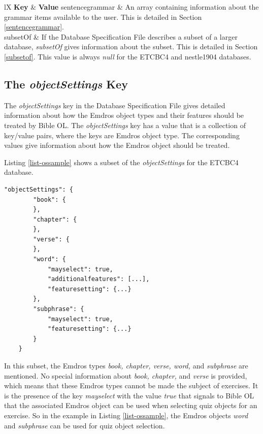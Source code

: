 \documentclass[11pt,oneside,a4paper]{memoir}
\makeatletter
\newenvironment{my-longtabu}[2]{
\begin{longtabu*}{@{}#1@{}}
  \toprule
  #2\\\addlinespace[-1mm]
  \midrule
  \endhead

  \emph{\rmfamily\normalsize(Continued...)} & \\
  \endfoot

  \addlinespace[-1mm]\bottomrule
  \endlastfoot
}{%
\end{longtabu*}
}
\newcommand{\headii}[2]{\textbf{#1} & \textbf{#2}}
\makeatother
\begin{document}
\begin{my-longtabu}{lX}{ \headii{Key}{Value} }
  sentencegrammar & An array containing information about the grammar items available to the user.
  This is detailed in Section \ref{sentencegrammar}.\\

  subsetOf & If the Database Specification File describes a subset of a larger database,
  \emph{subsetOf} gives information about the subset. This is detailed in Section
  \ref{subsetof}. This value is always \emph{null} for the ETCBC4 and nestle1904
  databases.\\

\end{my-longtabu}


\subsection{The \emph{objectSettings} Key}\label{sec-objectsettings}

The \emph{objectSettings} key in the Database Specification File gives detailed information about
how the Emdros object types and their features should be treated by Bible OL. The
\emph{objectSettings} key has a value that is a collection of key/value pairs, where the keys are
Emdros object type. The corresponding values give information about how the Emdros object should be
treated.

Listing \ref{list-ossample} shows a subset of the \emph{objectSettings} for the ETCBC4 database.

\begin{lstlisting}[caption=A sample objectSettings value,label=list-ossample]
    "objectSettings": {
        "book": {
        },
        "chapter": {
        },
        "verse": {
        },
        "word": {
            "mayselect": true,
            "additionalfeatures": [...],
            "featuresetting": {...}
        },
        "subphrase": {
            "mayselect": true,
            "featuresetting": {...}
        }
    }
\end{lstlisting}

In this subset, the Emdros types \emph{book, chapter, verse, word,} and \emph{subphrase} are
mentioned. No special information about \emph{book, chapter,} and \emph{verse} is provided, which
means that these Emdros types cannot be made the subject of exercises. It is the presence of the key
\emph{mayselect} with the value \emph{true} that signals to Bible OL that the associated Emdros
object can be used when selecting quiz objects for an exercise. So in the example in Listing
\ref{list-ossample}, the Emdros objects \emph{word} and \emph{subphrase} can be used for quiz object
selection.
\end{document}
